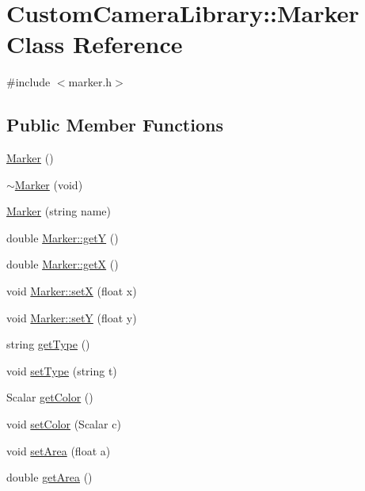 \hypertarget{class_custom_camera_library_1_1_marker}{}\section{Custom\+Camera\+Library\+:\+:Marker Class Reference}
\label{class_custom_camera_library_1_1_marker}


{\ttfamily \#include $<$marker.\+h$>$}

\subsection*{Public Member Functions}
\begin{DoxyCompactItemize}
\item 
\hyperlink{class_custom_camera_library_1_1_marker_ad4e167fa334fbde49f073e4362c4d3db}{Marker} ()
\item 
\hyperlink{class_custom_camera_library_1_1_marker_ac34f00758cfb07bcf550209083633eb6}{$\sim$\+Marker} (void)
\item 
\hyperlink{class_custom_camera_library_1_1_marker_af2d2ffcc36c375af9138c1ce65751361}{Marker} (string name)
\item 
double \hyperlink{class_custom_camera_library_1_1_marker_a531c9ce7513ee80a7e6c226840d81463}{Marker\+::getY} ()
\item 
double \hyperlink{class_custom_camera_library_1_1_marker_af6e5dd7cd6e768429e8dcd768042f208}{Marker\+::getX} ()
\item 
void \hyperlink{class_custom_camera_library_1_1_marker_ac7413e8da227e4e5551166ee7981f27a}{Marker\+::setX} (float x)
\item 
void \hyperlink{class_custom_camera_library_1_1_marker_a9ccca6aac23f01511539d9f9e1f874b8}{Marker\+::setY} (float y)
\item 
string \hyperlink{class_custom_camera_library_1_1_marker_a66beaaf58401fcbc9f69530aa23fe87f}{get\+Type} ()
\item 
void \hyperlink{class_custom_camera_library_1_1_marker_accb27bc1a4d0edc55571b6f29af41f4c}{set\+Type} (string t)
\item 
Scalar \hyperlink{class_custom_camera_library_1_1_marker_a4a9365c66d784ec641f36038ce0c1aa4}{get\+Color} ()
\item 
void \hyperlink{class_custom_camera_library_1_1_marker_a7433a7e4ab0bef65ad5987a81d984307}{set\+Color} (Scalar c)
\item 
void \hyperlink{class_custom_camera_library_1_1_marker_a39e4057984377e2dd2fa772dc2816b48}{set\+Area} (float a)
\item 
double \hyperlink{class_custom_camera_library_1_1_marker_a80e3a9409ad839045f9b6481c2334dce}{get\+Area} ()
\end{DoxyCompactItemize}


